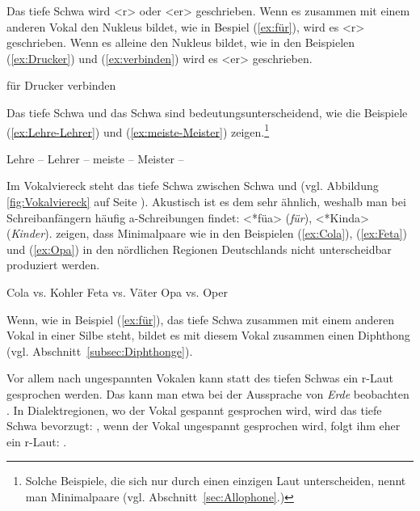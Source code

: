 Das  tiefe Schwa \textipa{[5]} wird <r> oder <er> geschrieben. Wenn es zusammen mit einem anderen Vokal den Nukleus bildet, wie in Bespiel (\ref{ex:für}), wird es <r> geschrieben. Wenn es alleine den Nukleus bildet, wie in den Beispielen (\ref{ex:Drucker}) und (\ref{ex:verbinden}) wird es <er> geschrieben. 

\ea
\ea \label{ex:für} für \textipa{[fy5]} 
\ex \label{ex:Drucker} Drucker 
\ex \label{ex:verbinden} verbinden 
\z 
\z

Das tiefe Schwa \textipa{[5]} und das Schwa \textipa{[@]} sind bedeutungsunterscheidend, wie die Beispiele (\ref{ex:Lehre-Lehrer}) und (\ref{ex:meiste-Meister}) zeigen.\footnote{Solche Beispiele, die sich nur durch einen einzigen Laut unterscheiden, nennt man Minimalpaare (vgl. Abschnitt~\ref{sec:Allophone}.)}

\ea
\ea \label{ex:Lehre-Lehrer} Lehre -- Lehrer \textipa{[\textprimstress le:.K@} -- \textipa{\textprimstress le:.K5]}
\ex \label{ex:meiste-Meister} meiste -- Meister \textipa{[\textprimstress m\t*{aI}s.t@} -- \textipa{\textprimstress m\t*{aI}s.t5]}
\z 
\z


Im Vokalviereck steht das tiefe Schwa zwischen Schwa und \textipa{[a]} (vgl. Abbildung \ref{fig:Vokalviereck} auf Seite \pageref{fig:Vokalviereck}). Akustisch ist es dem \textipa{[a]} sehr ähnlich, weshalb man bei Schreibanfängern häufig a-Schreibungen findet: <*füa> (\textit{für}), <*Kinda> (\textit{Kinder}). \citet[42]{RathckeMooshammer2020} zeigen, dass Minimalpaare wie in den Beispielen (\ref{ex:Cola}), (\ref{ex:Feta}) und (\ref{ex:Opa}) in den nördlichen Regionen Deutschlands nicht unterscheidbar produziert werden. 

\ea
\ea \label{ex:Cola} Cola \textipa{[\textprimstress ko:.la]} vs. Kohler \textipa{[\textprimstress ko:.l5]}
\ex \label{ex:Feta} Feta \textipa{[\textprimstress fe:.ta]} vs. Väter \textipa{[\textprimstress fe:.t5]}
\ex \label{ex:Opa} Opa \textipa{[\textprimstress Po:.pa]} vs. Oper \textipa{[\textprimstress Po:.p5]} 
\z 
\z


Wenn, wie in Beispiel (\ref{ex:für}), das tiefe Schwa zusammen mit einem anderen Vokal in einer Silbe steht, bildet es mit diesem Vokal zusammen einen Diphthong (vgl. Abschnitt~\ref{subsec:Diphthonge}). 

Vor allem nach ungespannten Vokalen kann statt des tiefen Schwas ein r-Laut gesprochen werden. Das kann man etwa bei der Aussprache von \textit{Erde} beobachten \citep[308]{DudenAussprache2023}. In Dialektregionen, wo der Vokal gespannt gesprochen wird, wird das tiefe Schwa bevorzugt: \textipa{[\textprimstress Pe:5.d@]}, wenn der Vokal  ungespannt gesprochen wird, folgt ihm eher ein r-Laut: .

